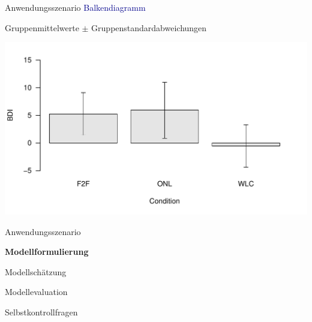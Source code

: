 \documentclass[
  8pt,
  ignorenonframetext,
]{beamer}
\begin{document}
\begin{frame}{Anwendungsszenario}
\protect\hypertarget{anwendungsszenario-5}{}
\textcolor{darkblue}{Balkendiagramm} \vspace{1mm}

\center

Gruppenmittelwerte \(\pm\) Gruppenstandardabweichungen

\vspace{3mm}

\begin{center}\includegraphics[width=0.95\linewidth]{10_Abbildungen/alm_10_aov_1_barplot} \end{center}
\end{frame}

\begin{frame}{}
\protect\hypertarget{section-4}{}
\large
{}
\vfill

Anwendungsszenario

\textbf{Modellformulierung}

Modellschätzung

Modellevaluation

Selbstkontrollfragen \vfill
\end{frame}
\end{document}
